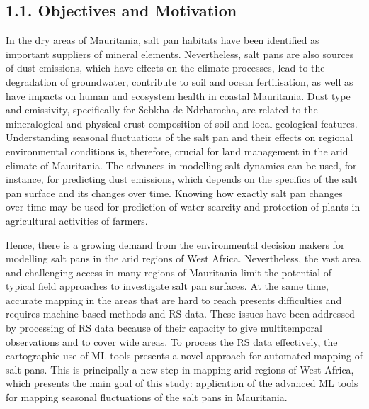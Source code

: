 \documentclass[12pt,a4paper,oneside]{article}
\def \newpar{\vspace{6pt}}
\begin{document}
\subsection*{1.1. Objectives and Motivation}

\newpar In the dry areas of Mauritania, salt pan habitats have been identified as important suppliers of mineral elements. Nevertheless, salt pans are also sources of dust emissions, which have effects on the climate processes, lead to the degradation of groundwater, contribute to soil and ocean fertilisation, as well as have impacts on human and ecosystem health in coastal Mauritania. Dust type and emissivity, specifically for Sebkha de Ndrhamcha, are related to the mineralogical and physical crust composition of soil and local geological features. Understanding seasonal fluctuations of the salt pan and their effects on regional environmental conditions is, therefore, crucial for land management in the arid climate of Mauritania. The advances in modelling salt dynamics can be used, for instance, for predicting dust emissions, which depends on the specifics of the salt pan surface and its changes over time. Knowing how exactly salt pan changes over time may be used for prediction of water scarcity and protection of plants in agricultural activities of farmers.

\newpar Hence, there is a growing demand from the environmental decision makers for modelling salt pans in the arid regions of West Africa. Nevertheless, the vast area and challenging access in many regions of Mauritania limit the potential of typical field approaches to investigate salt pan surfaces. At the same time, accurate mapping in the areas that are hard to reach presents difficulties and requires machine-based methods and RS data. These issues have been addressed by processing of RS data because of their capacity to give multitemporal observations and to cover wide areas. To process the RS data effectively, the cartographic use of ML tools presents a novel approach for automated mapping of salt pans. This is principally a new step in mapping arid regions of West Africa, which presents the main goal of this study: application of the advanced ML tools for mapping seasonal fluctuations of the salt pans in Mauritania.
\end{document}
